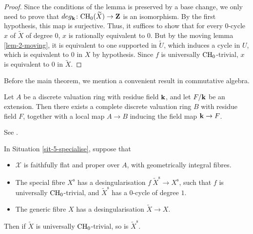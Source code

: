 \begin{proof}
    Since the conditions of the lemma is preserved by a base change, 
    we only need to prove that $\deg_{\bbk} \: \CH_0 (\widetilde{X}) \to \bbZ$
    is an isomorphism. By the first hypothesis, this map is surjective.
    Thus, it suffices to show that for every $0$-cycle $x$ of $\widetilde{X}$
    of degree $0$, $x$ is rationally equivalent to $0$.
    But by the moving lemma \ref{lem-2-moving},
    it is equivalent to one supported in $\widetilde{U}$,
    which induces a cycle in $U$, which is equivalent to $0$ in $X$ by hypothesis.
    Since $f$ is universally $\mathrm{CH}_0$-trivial,
    $x$ is equivalent to $0$ in $\widetilde{X}$.
\end{proof}

Before the main theorem,
we mention a convenient result in commutative algebra.

\begin{lemma} \label{lem-5-dvr}
    Let $A$ be a discrete valuation ring with residue field $\bbk$,
    and let $F/\bbk$ be an extension.
    Then there exists a complete discrete valuation ring $B$ with residue field $F$,
    together with a local map $A \to B$ inducing the field map $\bbk \to F$.
\end{lemma}

See \cite[Chapter~IX, Appendix, \S2, Corollary, and Exercise~4]{bourbaki-commutative}.

\begin{theorem}  \label{thm-5-spe-1}
    In Situation \textup{\ref{sit-5-specialise}}, suppose that
    \begin{itemize}
        \item
            $\mathscr{X}$ is faithfully flat and proper over $A$,
            with geometrically integral fibres.
        \item
            The special fibre $X^{\mathrm{s}}$
            has a desingularisation $f \: \widetilde{X}^{\mathrm{s}} \to X^{\mathrm{s}}$,
            such that $f$ is universally $\mathrm{CH}_0$-trivial,
            and $\widetilde{X}^{\mathrm{s}}$ has a $0$-cycle of degree $1$.
        \item
            The generic fibre $X$ 
            has a desingularisation $\widetilde{X} \to X$.
    \end{itemize}
    Then if $\widetilde{X}$ is universally $\mathrm{CH}_0$-trivial, so is $\widetilde{X}^{\mathrm{s}}$.
\end{theorem}

